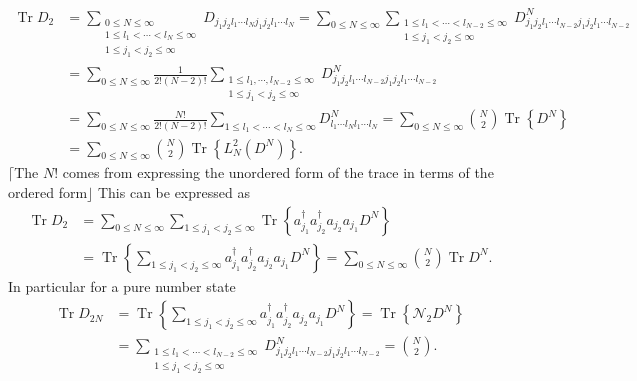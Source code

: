 \documentclass[aps,preprint]{revtex4}%
\begin{document}
\begin{align}
\operatorname{Tr}D_{2}  &  =\sum_{\substack{0\leq N\leq\infty\\1\leq
l_{1}<\cdots<l_{N}\leq\infty\\1\leq j_{1}<j_{2}\leq\infty}}D_{j_{1}j_{2}%
l_{1}\cdots l_{N}j_{1}j_{2}l_{1}\cdots l_{N}}=\sum_{0\leq N\leq\infty}%
\sum_{\substack{1\leq l_{1}<\cdots<l_{N-2}\leq\infty\\1\leq j_{1}<j_{2}%
\leq\infty}}D_{j_{1}j_{2}l_{1}\cdots l_{N-2}j_{1}j_{2}l_{1}\cdots l_{N-2}}%
^{N}\nonumber\\
&  =\sum_{0\leq N\leq\infty}\frac{1}{2!\left(  N-2\right)  !}\sum
_{\substack{1\leq l_{1},\cdots,l_{N-2}\leq\infty\\1\leq j_{1}<j_{2}\leq\infty
}}D_{j_{1}j_{2}l_{1}\cdots l_{N-2}j_{1}j_{2}l_{1}\cdots l_{N-2}}%
^{N}\nonumber\\
&  =\sum_{0\leq N\leq\infty}\frac{N!}{2!\left(  N-2\right)  !}\sum_{1\leq
l_{1}<\cdots<l_{N}\leq\infty}D_{l_{1}\cdots l_{N}l_{1}\cdots l_{N}}^{N}%
=\sum_{0\leq N\leq\infty}\binom{N}{2}\operatorname{Tr}\left\{  D^{N}\right\}
\nonumber\\
&  =\sum_{0\leq N\leq\infty}\binom{N}{2}\operatorname{Tr}\left\{  L_{N}%
^{2}\left(  D^{N}\right)  \right\}  .
\end{align}
$\lceil$The $N!$ comes from expressing the unordered form of the trace in
terms of the ordered form$\rfloor$ This can be expressed as
\begin{align}
\operatorname{Tr}D_{2}  &  =\sum_{0\leq N\leq\infty}\sum_{1\leq j_{1}%
<j_{2}\leq\infty}\operatorname{Tr}\left\{  a_{j_{1}}^{\dagger}a_{j_{2}%
}^{\dagger}a_{j_{2}}a_{j_{1}}D^{N}\right\} \nonumber\\
&  =\operatorname{Tr}\left\{  \sum_{1\leq j_{1}<j_{2}\leq\infty}a_{j_{1}%
}^{\dagger}a_{j_{2}}^{\dagger}a_{j_{2}}a_{j_{1}}D^{N}\right\}  =\sum_{0\leq
N\leq\infty}\binom{N}{2}\operatorname{Tr}D^{N}.
\end{align}
In particular for a pure number state
\begin{align}
\operatorname{Tr}D_{2N}  &  =\operatorname{Tr}\left\{  \sum_{1\leq j_{1}%
<j_{2}\leq\infty}a_{j_{1}}^{\dagger}a_{j_{2}}^{\dagger}a_{j_{2}}a_{j_{1}}%
D^{N}\right\}  =\operatorname{Tr}\left\{  \mathcal{N}_{2}D^{N}\right\}
\nonumber\\
&  =\sum_{\substack{1\leq l_{1}<\cdots<l_{N-2}\leq\infty\\1\leq j_{1}%
<j_{2}\leq\infty}}D_{j_{1}j_{2}l_{1}\cdots l_{N-2}j_{1}j_{2}l_{1}\cdots
l_{N-2}}^{N}=\binom{N}{2}.
\end{align}
\end{document}
